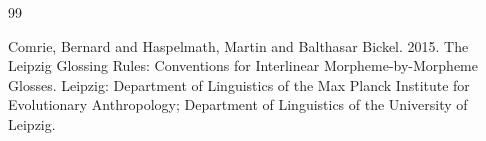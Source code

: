 \documentclass[a4paper, ruler]{CUP-JNL-LIN}%
\begin{document}
\begin{Backmatter}
\begin{thebibliography}{99}

{Comrie, Bernard and Haspelmath, Martin and {Balthasar Bickel}}. 2015. The Leipzig Glossing Rules: Conventions for Interlinear Morpheme-by-Morpheme Glosses. Leipzig: Department of Linguistics of the Max Planck Institute for Evolutionary Anthropology; Department of Linguistics of the University of Leipzig.




\end{thebibliography}
\end{Backmatter}
\end{document}
